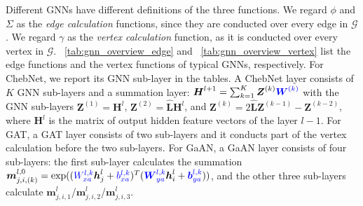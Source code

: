 Different GNNs have different definitions of the three functions.
We regard $\phi$ and $\Sigma$ as the \emph{edge calculation} functions, since they are conducted over every edge in $\mathcal{G}$.
We regard $\gamma$ as the \emph{vertex calculation} function, as it is conducted over every vertex in $\mathcal{G}$.
\tablename~\ref{tab:gnn_overview_edge} and \tablename~\ref{tab:gnn_overview_vertex} list the edge functions and the vertex functions of typical GNNs, respectively.
For ChebNet, we report its GNN sub-layer in the tables.
A ChebNet layer consists of $K$ GNN sub-layers and a summation layer:
$\boldsymbol{H}^{l+1} = \sum_{k=1}^K{\boldsymbol{Z}^{(k)} \textcolor{blue}{\boldsymbol{W}^{(k)}}}$ with the GNN sub-layers $\boldsymbol{Z}^{(1)}=\boldsymbol{H}^l$, $\boldsymbol{Z}^{(2)}=\hat{\boldsymbol{L}}\boldsymbol{H}^l$, and $\boldsymbol{Z}^{(k)}=2\hat{\boldsymbol{L}}\boldsymbol{Z}^{(k-1)} - \boldsymbol{Z}^{(k-2)}$, where $\boldsymbol{H}^l$ is the matrix of output hidden feature vectors of the layer $l-1$.
For GAT, a GAT layer consists of two sub-layers and it conducts part of the vertex calculation before the two sub-layers.
For GaAN, a GaAN layer consists of four sub-layers: the first sub-layer calculates the summation $\boldsymbol{m}_{j, i, (k)}^{l,0}  = \exp((\textcolor{blue}{W^{l, k}_{xa}} \boldsymbol{h}_j^l + \textcolor{blue}{b^{l, k}_{xa}})^T (\textcolor{blue}{\boldsymbol{W}^{l, k}_{ya}} \boldsymbol{h}_i^l + \textcolor{blue}{\boldsymbol{b}^{l,k}_{ya}}))$, and the other three sub-layers calculate $\boldsymbol{m}^l_{j,i,1}$/$\boldsymbol{m}^l_{j,i,2}$/$\boldsymbol{m}^l_{j,i,3}$.

